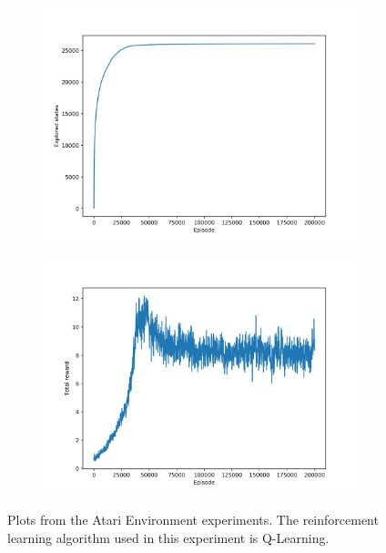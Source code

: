 \begin{figure}
\centering
\begin{subfigure}[h]{\linewidth}
\includegraphics[width=\linewidth]{images/atari-ql-explored-states.png}
\centering
\end{subfigure}
\hfill
\begin{subfigure}[h]{\linewidth}
\includegraphics[width=\linewidth]{images/atari-ql-total-reward.png}
\centering
\end{subfigure}
\caption{Plots from the Atari Environment experiments. The reinforcement learning algorithm used in this experiment is Q-Learning.}
\end{figure}
